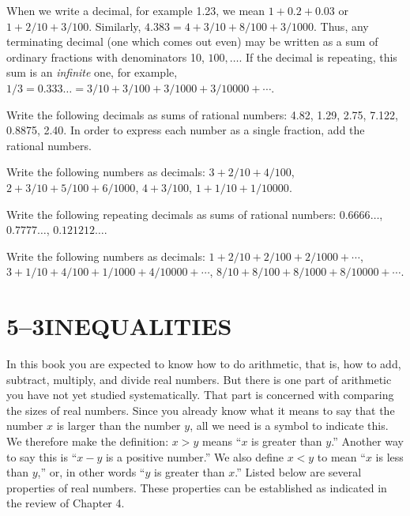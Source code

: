 \documentclass[11pt]{book}
\begin{document}
When we write a decimal, for example 1.23, we mean $1 + 0.2 + 0.03$ or
$1 + 2/10 + 3/100$. Similarly, $4.383 = 4 + 3/10 + 8/100 + 3/1000$. Thus, any
terminating decimal (one which comes out even) may be written as a sum of
ordinary fractions with denominators 10, $100,\ldots$. If the decimal is
repeating, this sum is an \emph{infinite} one, for example,
$1/3 = 0.333\ldots = 3/10 + 3/100 + 3/1000 + 3/10000 + \cdots$.


\begin{exercisecols}
\begin{exlist}
\item Write the following decimals as sums of rational numbers: 4.82, 1.29,
      2.75, 7.122, 0.8875, 2.40. In order to express each number as a single
      fraction, add the rational numbers.
\item Write the following numbers as decimals: $3 + 2/10 + 4/100$,
      $2 + 3/10 + 5/100 + 6/1000$, $4 + 3/100$, $1 + 1/10 + 1/10000$.
\item Write the following repeating decimals as sums of rational numbers:
      $0.6666\ldots$, $0.7777\ldots$, $0.121212\ldots$.
\item Write the following numbers as decimals:
      $1 + 2/10 + 2/100 + 2/1000 + \cdots$,
      $3 + 1/10 + 4/100 + 1/1000 + 4/10000 + \cdots$,
      $8/10 + 8/100 + 8/1000 + 8/10000 + \cdots$.
\end{exlist}
\end{exercisecols}

\section*{5--3\quad INEQUALITIES}

In this book you are expected to know how to do arithmetic, that is, how to
add, subtract, multiply, and divide real numbers. But there is one part of
arithmetic you have not yet studied systematically. That part is concerned with
comparing the sizes of real numbers. Since you already know what it means to
say that the number $x$ is larger than the number $y$, all we need is a symbol
to indicate this. We therefore make the definition: $x > y$ means ``$x$ is
greater than $y$.'' Another way to say this is ``$x - y$ is a positive
number.'' We also define $x < y$ to mean ``$x$ is less than $y$,'' or, in other
words ``$y$ is greater than $x$.'' Listed below are several properties of real
numbers. These properties can be established as indicated in the review of
Chapter 4.
\end{document}
